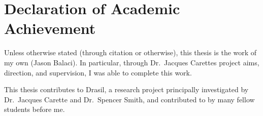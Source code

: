 \chapter{Declaration of Academic Achievement}
\label{chap:declaration_of_academic_achievement}

Unless otherwise stated (through citation or otherwise), this thesis is the work
of my own (Jason Balaci). In particular, through Dr.\ Jacques Carettes project
aims, direction, and supervision, I was able to complete this work.

This thesis contributes to Drasil, a research project principally investigated
by Dr.\ Jacques Carette and Dr.\ Spencer Smith, and contributed to by many
fellow students before me.
